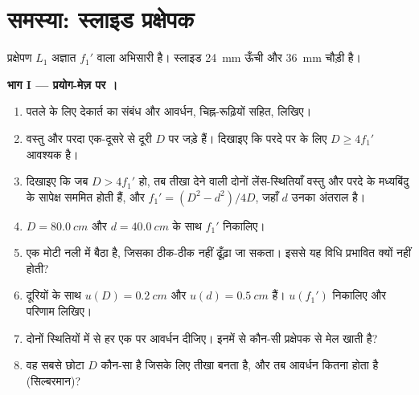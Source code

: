 \section{समस्या: स्लाइड प्रक्षेपक}

\begin{problem}
\label{pb:b1:mirrors-thin-lenses:1}
प्रक्षेपण  $L_1$ अज्ञात  $f_1'$ वाला अभिसारी  है।
स्लाइड \qty{24}{mm} ऊँची और \qty{36}{mm} चौड़ी है।

\medskip
\noindent\textbf{भाग I --- प्रयोग-मेज़ पर ।}
\begin{enumerate}
  \item पतले  के लिए देकार्त का संबंध और आवर्धन, चिह्न-रूढ़ियों सहित,
        लिखिए।
  \item वस्तु और परदा एक-दूसरे से दूरी $D$ पर जड़े हैं। दिखाइए कि परदे पर
         के लिए $D \geq 4f_1'$ आवश्यक है।
  \item दिखाइए कि जब $D > 4f_1'$ हो, तब तीखा  देने वाली दोनों
        लेंस-स्थितियाँ वस्तु और परदे के मध्यबिंदु के सापेक्ष सममित होती हैं,
        और $f_1' = (D^2 - d^2)/4D$, जहाँ $d$ उनका अंतराल है।
  \item $D = \qty{80.0}{cm}$ और $d = \qty{40.0}{cm}$ के साथ
        $f_1'$ निकालिए।
  \item {} एक मोटी नली में बैठा है, जिसका  ठीक-ठीक नहीं
        ढूँढ़ा जा सकता। इससे यह विधि प्रभावित क्यों नहीं होती?
  \item दूरियों के साथ $u(D) = \qty{0.2}{cm}$ और
        $u(d) = \qty{0.5}{cm}$ हैं। $u(f_1')$ निकालिए और परिणाम लिखिए।
  \item दोनों स्थितियों में से हर एक पर आवर्धन दीजिए। इनमें से कौन-सी
        प्रक्षेपक से मेल खाती है?
  \item वह सबसे छोटा $D$ कौन-सा है जिसके लिए तीखा  बनता है, और
        तब आवर्धन कितना होता है (सिल्बरमान)?
\end{enumerate}


\end{problem}

